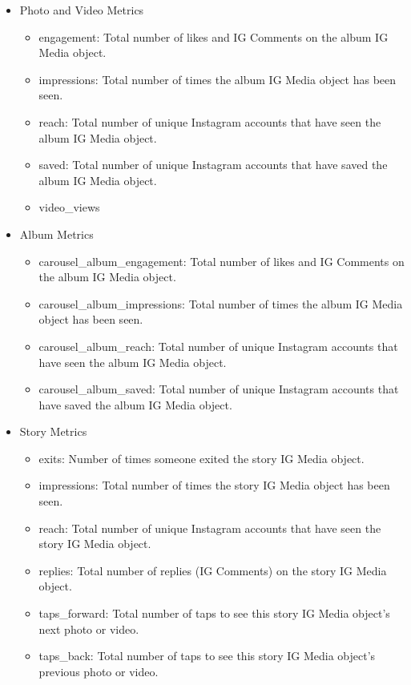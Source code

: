 \begin{itemize}
    \item Photo and Video Metrics
    \begin{itemize}
        \item engagement: Total number of likes and IG Comments on the album IG Media object.
        \item impressions: Total number of times the album IG Media object has been seen.
        \item reach: Total number of unique Instagram accounts that have seen the album IG Media object.
        \item saved: Total number of unique Instagram accounts that have saved the album IG Media object.
        \item video\_views
    \end{itemize}

    \item Album Metrics
    \begin{itemize}
        \item carousel\_album\_engagement: Total number of likes and IG Comments on the album IG Media object.
        
        \item carousel\_album\_impressions: Total number of times the album IG Media object has been seen.
        
        \item carousel\_album\_reach: Total number of unique Instagram accounts that have seen the album IG Media object.
        
        \item carousel\_album\_saved: Total number of unique Instagram accounts that have saved the album IG Media object.
    \end{itemize}
    \item Story Metrics
    \begin{itemize}
        \item exits: Number of times someone exited the story IG Media object.
        
        \item  impressions: Total number of times the story IG Media object has been seen.
        
        \item reach: Total number of unique Instagram accounts that have seen the story IG Media object.
        
        \item replies: Total number of replies (IG Comments) on the story IG Media object.
        
        \item  taps\_forward: Total number of taps to see this story IG Media object's next photo or video.

        \item taps\_back: Total number of taps to see this story IG Media object's previous photo or video.
    \end{itemize}
\end{itemize}


